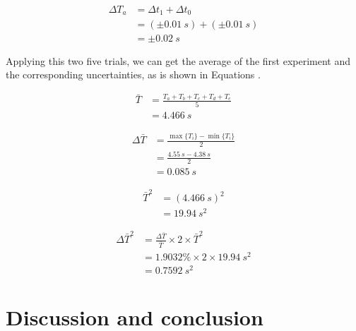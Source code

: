 \documentclass[a4paper]{article}
\begin{document}
\begin{equation}
    \begin{aligned}
        \Delta T_a &= \Delta t_1 + \Delta t_0 \\
                   &= (\pm \SI{0.01}{s}) + (\pm\SI{0.01}{s}) \\
                   &= \pm \SI{0.02}{s}
    \end{aligned}
    \label{eq.dta}
\end{equation}

Applying this two five trials, we can get the average of the first experiment and the corresponding uncertainties, as is shown in Equations .

\begin{equation}
    \begin{aligned}
        \bar{T} &= \frac{T_a + T_b + T_c + T_d + T_e}{5} \\
                &= \SI{4.466}{s}
    \end{aligned}
\end{equation}

\begin{equation}
    \begin{aligned}
        \Delta\bar{T} &= \frac{\max\{T_i\} - \min\{T_i\}}{2} \\
                      &= \frac{\SI{4.55}{s} - \SI{4.38}{s}}{2} \\
                      &= \SI{0.085}{s}
    \end{aligned}
\end{equation}

\begin{equation}
    \begin{aligned}
        \bar{T}^2 &= (\SI{4.466}{s})^2\\
                        &= \SI{19.94}{s^2}
    \end{aligned}
\end{equation}

\begin{equation}
    \begin{aligned}
        \Delta\bar{T}^2 &= \frac{\Delta\bar{T}}{\bar{T}}\times 2 \times \bar{T}^2\\
                        &= 1.9032\% \times 2 \times \SI{19.94}{s^2}\\
                        &= \SI{0.7592}{s^2}
    \end{aligned}
\end{equation}


\section{Discussion and conclusion}
\end{document}
